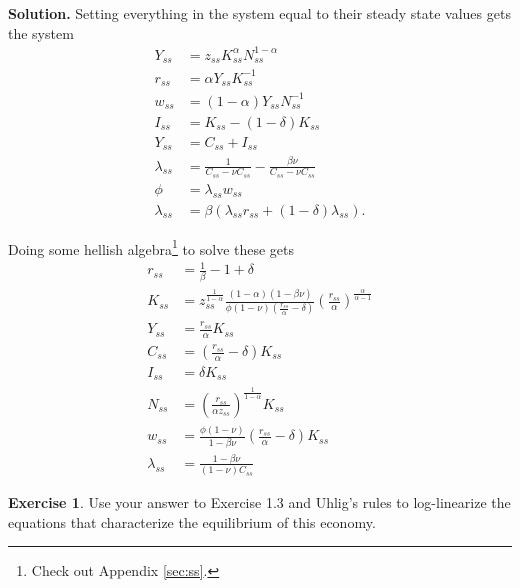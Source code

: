 \documentclass[11pt]{article}
\numberwithin{equation}{section} %
\numberwithin{figure}{section} %
\numberwithin{table}{section} %
\theoremstyle{definition}
\newtheorem{exercise}[theorem]{Exercise}
\newenvironment{solution}{\begin{addmargin}[2em]{0em} {\bf Solution. }}{\end{addmargin}}
\begin{document}
\begin{solution}
    Setting everything in the system equal to their steady state values gets the system
    \begin{align*}
        Y_{ss} &= z_{ss} K_{ss}^\alpha N_{ss}^{1-\alpha} \\
        r_{ss} &= \alpha Y_{ss} K_{ss}^{-1} \\
        w_{ss} &= (1 - \alpha) Y_{ss} N_{ss}^{-1} \\
        I_{ss} &= K_{ss} - (1 - \delta) K_{ss} \\
        Y_{ss} &= C_{ss} + I_{ss} \\
        \lambda_{ss} &= \frac{1}{C_{ss} - \nu C_{ss}} - \frac{\beta \nu}{C_{ss} - \nu C_{ss}} \\
        \phi &= \lambda_{ss} w_{ss} \\
        \lambda_{ss} &= \beta(\lambda_{ss} r_{ss} + (1-\delta) \lambda_{ss}).
    \end{align*}

    Doing some hellish algebra\footnote{Check out Appendix \ref{sec:ss}.} to solve these gets
    \begin{align*}
        r_{ss} &= \frac{1}{\beta} - 1 + \delta \\
        K_{ss} &= z_{ss}^{\frac{1}{1-\alpha}}\frac{(1-\alpha)(1-\beta \nu)}{\phi (1 - \nu) \left(\frac{r_{ss}}{\alpha} - \delta\right)} \left(\frac{r_{ss}}{\alpha}\right)^{\frac{\alpha}{\alpha-1}} \\
        Y_{ss} &= \frac{r_{ss}}{\alpha} K_{ss} \\
        C_{ss} &= \left(\frac{r_{ss}}{\alpha} - \delta\right) K_{ss}\\
        I_{ss} &= \delta K_{ss} \\
        N_{ss} &= \left(\frac{r_{ss}}{\alpha z_{ss}}\right)^{\frac{1}{1-\alpha}} K_{ss} \\
        w_{ss} &= \frac{\phi (1-\nu)}{1-\beta\nu} \left(\frac{r_{ss}}{\alpha} - \delta\right) K_{ss}\\
        \lambda_{ss} &= \frac{1 - \beta\nu}{(1-\nu) C_{ss}}
    \end{align*}
\end{solution}


\begin{exercise}
    Use your answer to Exercise 1.3 and Uhlig's rules to log-linearize the equations that characterize the equilibrium of this economy.
\end{exercise}
\end{document}
